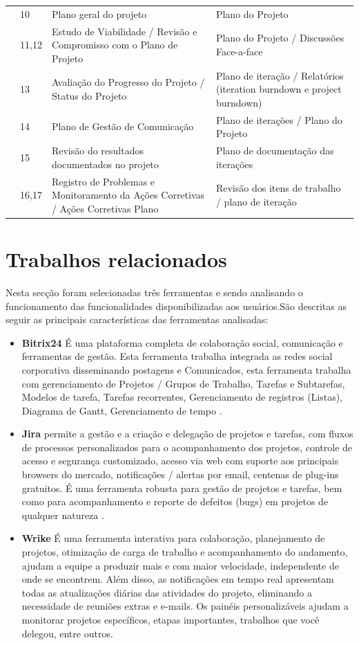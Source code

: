 \documentclass{acm_proc_article-sp}
\begin{document}
\begin{table}[h]
\begin{tabular}{|p{10mm}|p{10mm}|p{70mm}|p{70mm}|}
& 10 & Plano geral do projeto & Plano do Projeto \\
& 11,12 & Estudo de Viabilidade / Revisão e Compromisso com o Plano de Projeto & Plano do Projeto / Discussões Face-a-face \\
& 13 & Avaliação do Progresso do Projeto / Status do Projeto & Plano de iteração / Relatórios (iteration burndown
e project burndown)\\
& 14 & Plano de Gestão de Comunicação & Plano de iterações / Plano do Projeto \\
& 15 & Revisão do resultados documentados no projeto & Plano de documentação das iterações \\
& 16,17 & Registro de Problemas e Monitoramento da Ações Corretivas / Ações Corretivas Plano & Revisão dos itens de trabalho / plano de iteração \\

\hline
\end{tabular}
\end{table}

\section{Trabalhos relacionados}
Nesta secção foram selecionadas três ferramentas e sendo analisando o funcionamento das funcionalidades disponibilizadas aos usuários.São descritas as seguir as principais características das ferramentas analisadas:

\begin{itemize}
\item \textbf{Bitrix24} É uma plataforma completa de colaboração social, comunicação e ferramentas de gestão. Esta ferramenta trabalha integrada as redes social corporativa disseminando postagens e Comunicados, esta ferramenta trabalha com gerenciamento de Projetos / Grupos de Trabalho, Tarefas e Subtarefas, Modelos de tarefa, Tarefas recorrentes, Gerenciamento de registros (Listas), Diagrama de Gantt, Gerenciamento de tempo \cite{bitrix24:ferramenta}.
\item \textbf{Jira}  permite a gestão e a criação e delegação de projetos e tarefas, com fluxos de processos personalizados para o acompanhamento dos projetos, controle de acesso e segurança customizado, acesso via web com suporte aos principais browsers do mercado, notificações / alertas por email,  centenas de plug-ins gratuitos. É uma ferramenta robusta para gestão de projetos e tarefas, bem como para acompanhamento e reporte de defeitos (bugs) em projetos de qualquer natureza \cite{jira:ferramenta}.
\item \textbf{Wrike} É uma ferramenta interativa para colaboração, planejamento de projetos, otimização de carga de trabalho e acompanhamento do andamento, ajudam a equipe a produzir mais e com maior velocidade, independente de onde se encontrem. Além disso, as notificações em tempo real apresentam todas as atualizações diárias das atividades do projeto, eliminando a necessidade de reuniões extras e e-mails. Os painéis personalizáveis ajudam a monitorar projetos específicos, etapas importantes, trabalhos que você delegou, entre outros.  
\end{itemize}
\end{document}
